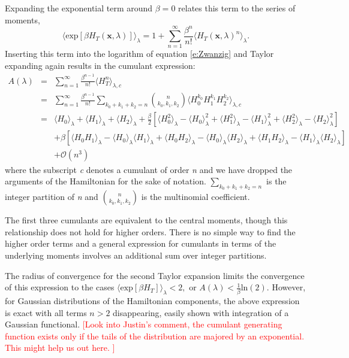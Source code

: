 \documentclass[%
 preprint,
 amsmath,amssymb,
 aps,
]{revtex4-1}
\newcommand{\warning}[1]{{\textsf{{\textcolor{red}{{[#1]}{}}}}}}
\renewcommand{\vec}[1]{{\mathbf{#1}}}
\begin{document}
Expanding the exponential term around $\beta=0$ relates this term to the series of moments,
\begin{equation}
 \langle \mbox{exp} \left[ \beta H_T (\vec{x},\lambda) \right]  \rangle_{\lambda} = 
 1+\sum_{n=1}^{\infty}  \frac{\beta^n}{n!} \langle  H_T (\vec{x},\lambda)^n \rangle_{\lambda}.
\label{e:Taylor1}
\end{equation}
Inserting this term into the logarithm of equation \ref{e:Zwanzig} and Taylor expanding again results in the cumulant 
expression:
\begin{eqnarray}
A (\lambda) &=& \sum_{n=1}^{\infty}  \frac{\beta^{n-1}}{n!} \langle  H_T^n \rangle_{\lambda,c} \\
& = &
\sum_{n=1}^{\infty}  \frac{\beta^{n-1}}{n!}  \sum_{k_0+k_1+k_2=n} 
{ n \choose k_0,k_1,k_2 } \langle  H_0^{k_0} H_1^{k_1} H_2^{k_2} \rangle_{\lambda,c} \\
& = &
\langle  H_0 \rangle_{\lambda}  + \langle  H_1 \rangle_{\lambda} + \langle  H_2 \rangle_{\lambda}  
+ \frac{\beta}{2} \left[  \langle  H_0^2 \rangle_{\lambda} -\langle  H_0 \rangle^2_{\lambda}  +
\langle  H_1^2 \rangle_{\lambda} -\langle  H_1 \rangle^2_{\lambda}  
 + \langle  H_2^2 \rangle_{\lambda} -\langle  H_2 \rangle^2_{\lambda}   \right] 
\\ 
 & & 
 + \beta \left[ \langle  H_0 H_1\rangle_{\lambda} -\langle  H_0 \rangle_{\lambda} \langle  H_1 \rangle_{\lambda} 
 +\langle  H_0 H_2\rangle_{\lambda} -\langle  H_0 \rangle_{\lambda} \langle  H_2 \rangle_{\lambda} 
 +\langle  H_1 H_2\rangle_{\lambda} -\langle  H_1 \rangle_{\lambda} \langle  H_2 \rangle_{\lambda} 
   \right]
  \\ & & 
 + \mathcal{O} (n^3)
\label{e:CumulantTot}
\end{eqnarray}
where the subscript \emph{c} denotes a cumulant of order \emph{n} and we have dropped the arguments of the Hamiltonian for the sake of notation.  $ \sum_{k_0+k_1+k_2=n} $ is the integer partition of \emph{n} and 
${ n \choose k_0,k_1,k_2 }$ is the multinomial coefficient.

The first three cumulants are equivalent to the central moments, though this relationship does not hold for higher orders.  There is no simple way to find the higher order terms and a general expression for cumulants in terms of the underlying moments involves an additional sum over integer partitions.\cite{NULL}

The radius of convergence for the second Taylor expansion limits the convergence of this expression to the cases  
$
\langle \mbox{exp} \left[ \beta H_T  \right]  \rangle_{\lambda} < 2,
$
or 
$
A (\lambda) < \frac{1}{\beta}\mbox{ln} (2)
$.  However, for Gaussian distributions of the Hamiltonian components, the above expression is exact with all terms $n>2$ disappearing, easily shown with integration of a Gaussian functional. 
\warning{Look into Justin's comment, the cumulant generating function exists only if the tails of the distribution are majored by an exponential.  This might help us out here. }
\end{document}
